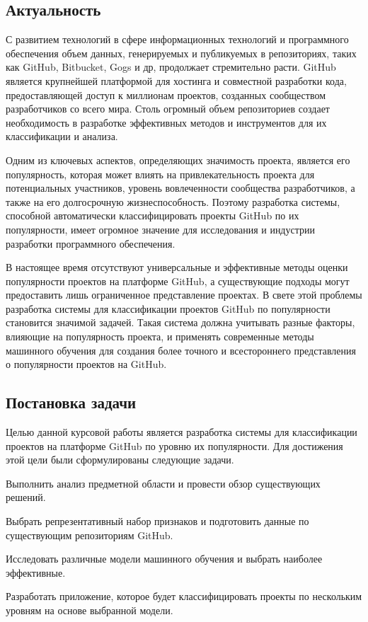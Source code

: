 \newpage
{}
\subsection*{Актуальность}
С развитием технологий в сфере информационных технологий и программного обеспечения объем данных, генерируемых и публикуемых в репозиториях, таких как GitHub, Bitbucket, Gogs и др, продолжает стремительно расти. GitHub является крупнейшей платформой для хостинга и совместной разработки кода, предоставляющей доступ к миллионам проектов, созданных сообществом разработчиков со всего мира. Столь огромный объем репозиториев создает необходимость в разработке эффективных методов и инструментов для их классификации и анализа.

Одним из ключевых аспектов, определяющих значимость проекта, является его популярность, которая может влиять на привлекательность проекта для потенциальных участников, уровень вовлеченности сообщества разработчиков, а также на его долгосрочную жизнеспособность. Поэтому разработка системы, способной автоматически классифицировать проекты GitHub по их популярности, имеет огромное значение для исследования и индустрии разработки программного обеспечения.

В настоящее время отсутствуют универсальные и эффективные методы оценки популярности проектов на платформе GitHub, а существующие подходы могут предоставить лишь ограниченное представление проектах. В свете этой проблемы разработка системы для классификации проектов GitHub по популярности становится значимой задачей. Такая система должна учитывать разные факторы, влияющие на популярность проекта, и применять современные методы машинного обучения для создания более точного и всестороннего представления о популярности проектов на GitHub.

\subsection*{Постановка задачи}

Целью данной курсовой работы является разработка системы для классификации проектов на платформе GitHub по уровню их популярности. Для достижения этой цели были сформулированы следующие задачи.

\begin{enumerateparen}
    \item Выполнить анализ предметной области и провести обзор существующих решений.

    \item Выбрать репрезентативный набор признаков и подготовить данные по существующим репозиториям GitHub.

   \item Исследовать различные модели машинного обучения и выбрать наиболее эффективные.

    \item Разработать приложение, которое будет классифицировать проекты по нескольким уровням на основе выбранной модели.
\end{enumerateparen}


